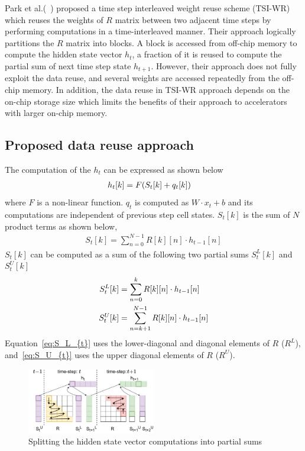 \documentclass[a4paper,10pt]{article}
\begin{document}
Park et al.(~\cite{park2020time}) proposed a time step interleaved weight reuse scheme (TSI-WR) which reuses the weights of $R$ matrix between two adjacent time steps by performing computations in a time-interleaved manner. Their approach logically partitions the $R$ matrix into blocks. A block is accessed from off-chip memory to compute the hidden state vector $h_t$, a fraction of it is reused to compute the partial sum of next time step state $h_{t+1}$. However, their approach does not fully exploit the data reuse, and several weights are accessed repeatedly from the off-chip memory. In addition, the data reuse in TSI-WR approach depends on the on-chip storage size which limits the benefits of their approach to accelerators with larger on-chip memory.
\subsection{Proposed data reuse approach}
The computation of the $h_t$ can be expressed as shown below
\begin{align}\label{eq:h_{t}}
	h_{t}[k] &= F( S_{t}[k]+q_{t}[k])
\end{align}
where $F$ is a non-linear function. $q_{t}$ is computed as $W{\cdot}x_t{+}b$ and its computations are independent of previous step cell states. $S_{t}[k]$ is the sum of $N$ product terms as shown below,
\begin{align}
	S_{t}[k] = \sum_{n=0}^{N-1}R[k][n]\cdot h_{t-1}[n]
\end{align}
$S_{t}[k]$ can be computed as a sum of the following two partial sums $S_{t}^{L}[k]$ and $S_{t}^{U}[k]$
\begin{align}      
	S_{t}^{L}[k] &= \sum_{n=0}^{k}R[k][n]\cdot h_{t-1}[n] \label{eq:S_L_{t}}\\
	S_{t}^{U}[k] &= \sum_{n=k+1}^{N-1}R[k][n]\cdot h_{t-1}[n] \label{eq:S_U_{t}}
\end{align}
Equation~\eqref{eq:S_L_{t}} uses the lower-diagonal and diagonal elements of $R$ ($R^L$), and~\eqref{eq:S_U_{t}} uses the upper diagonal elements of $R$ ($R^U$). 
\begin{figure}[!htb]
    \captionsetup{font=sf}
	\centerline{\includegraphics[width=0.5\textwidth]{TwoTimeSteps.pdf}}
	\caption{Splitting the hidden state vector computations into partial sums}
	\label{fig:TwoTimeStepsComputation}
\end{figure}
\end{document}
